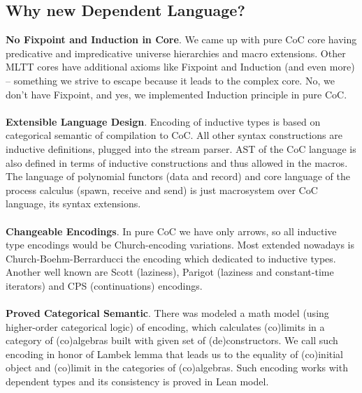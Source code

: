 \documentclass[11pt,oneside]{article}
\begin{document}
\subsection{Why new Dependent Language?}
\vspace{0.3cm}
{\bf No Fixpoint and Induction in Core}. We came up with pure CoC core having predicative
and impredicative universe hierarchies and macro extensions. Other MLTT cores have additional
axioms like Fixpoint and Induction (and even more) -- something we strive to escape
because it leads to the complex core. No, we don't have Fixpoint, and yes,
we implemented Induction principle in pure CoC.

\paragraph{}
{\bf Extensible Language Design}. Encoding of inductive types is based on categorical semantic
of compilation to CoC. All other syntax constructions are inductive definitions, plugged
into the stream parser. AST of the CoC language is also defined in terms of inductive
constructions and thus allowed in the macros. The language of polynomial functors (data
and record) and core language of the process calculus (spawn, receive and send) is just
macrosystem over CoC language, its syntax extensions.

\paragraph{}
{\bf Changeable Encodings}. In pure CoC we have only arrows, so all inductive type encodings
would be Church-encoding variations. Most extended nowadays is Church-Boehm-Berrarducci
the encoding which dedicated to inductive types. Another well known are Scott (laziness),
Parigot (laziness and constant-time iterators) and CPS (continuations) encodings.

\paragraph{}
{\bf Proved Categorical Semantic}. There was modeled a math model (using higher-order
categorical logic) of encoding, which calculates (co)limits in a category of (co)algebras
built with given set of (de)constructors. We call such encoding in honor of Lambek lemma
that leads us to the equality of (co)initial object and (co)limit in the categories
of (co)algebras. Such encoding works with dependent types and its consistency is proved
in Lean model.
\newpage
\end{document}
